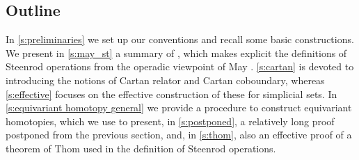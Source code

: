 
\subsection*{Outline}

In \cref{s:preliminaries} we set up our conventions and recall some basic constructions.
We present in \cref{s:may_st} a summary of \cite{medina2021may_st}, which makes explicit the definitions of Steenrod operations \cite{steenrod1953cyclic} from the operadic viewpoint of May \cite{may1970general}.
\cref{s:cartan} is devoted to introducing the notions of Cartan relator and Cartan coboundary, whereas \cref{s:effective} focuses on the effective construction of these for simplicial sets.
In \cref{s:equivariant homotopy general} we provide a procedure to construct equivariant homotopies, which we use to present, in \cref{s:postponed}, a relatively long proof postponed from the previous section, and, in \cref{s:thom}, also an effective proof of a theorem of Thom used in the definition of Steenrod operations.